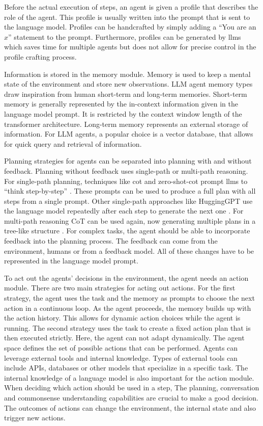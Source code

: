\documentclass[../main.tex]{subfiles}
\begin{document}
Before the actual execution of steps, an agent is given a profile that describes
the role of the agent.
This profile is usually written into the prompt that is sent to the language model.
Profiles can be handcrafted by simply adding a ``You are an $x$'' statement to the prompt.
Furthermore, profiles can be generated by \glspl{llm} which saves time for multiple agents
but does not allow for precise control in the profile crafting process.

Information is stored in the memory module.
Memory is used to keep a mental state of the environment and store new observations.
LLM agent memory types draw inspiration from human short-term and long-term memories.
Short-term memory is generally represented by the in-context information given in the language model prompt.
It is restricted by the context window length of the transformer architecture.
Long-term memory represents an external storage of information.
For LLM agents, a popular choice is a vector database,
that allows for quick query and retrieval of information.

Planning strategies for agents can be separated into planning with and without feedback.
Planning without feedback uses single-path or multi-path reasoning.
For single-path planning, techniques like \gls{cot} and zero-shot-\gls{cot} prompt \glspl{llm}
to ``think step-by-step'' \cite{Wei2022}.
These prompts can be used to produce a full plan with all steps from a single prompt.
Other single-path approaches like HuggingGPT
use the language model repeatedly after each step
to generate the next one \cite{Shen2023}.
For multi-path reasoning CoT can be used again, now generating multiple plans
in a tree-like structure \cite{Yao2023}.
For complex tasks, the agent should be able to incorporate feedback into
the planning process.
The feedback can come from the environment, humans or from a feedback model.
All of these changes have to be represented in the language model prompt.

To act out the agents' decisions in the environment, the agent needs an
action module.
There are two main strategies for acting out actions.
For the first strategy,
the agent uses the task and the memory as prompts
to choose the next action in a continuous loop.
As the agent proceeds, the memory builds up with the action history.
This allows for dynamic action choices while the agent is running.
The second strategy uses the task to create a fixed action plan
that is then executed strictly.
Here, the agent can not adapt dynamically.
The agent space defines the set of possible actions that can be performed.
Agents can leverage external tools and internal knowledge.
Types of external tools can include APIs, databases or other models
that specialize in a specific task.
The internal knowledge of a language model is also important for the action module.
When deciding which action should be used in a step,
The planning, conversation and commonsense understanding capabilities
are crucial to make a good decision.
The outcomes of actions can change the environment, the internal state and
also trigger new actions.
\end{document}
